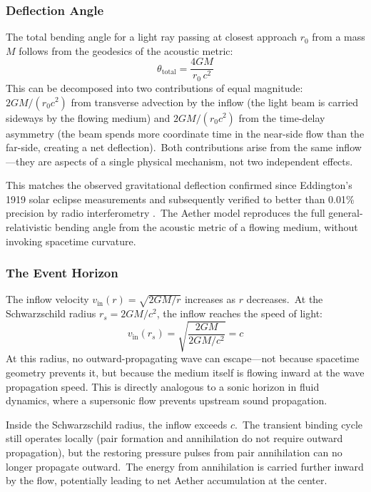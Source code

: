 ﻿\documentclass[12pt,letterpaper]{article}
\newcommand{\vin}{v_{\mathrm{in}}}
\newcommand{\rs}{r_s}
\begin{document}
\subsubsection{Deflection Angle}

The total bending angle for a light ray passing at closest approach $r_0$ from a mass
$M$ follows from the geodesics of the acoustic metric:
%
\begin{equation}
  \theta_{\mathrm{total}} = \frac{4GM}{r_0 \, c^2}
  \label{eq:lensing}
\end{equation}
%
This can be decomposed into two contributions of equal magnitude:
$2GM/(r_0 c^2)$ from transverse advection by the inflow (the light beam is
carried sideways by the flowing medium) and $2GM/(r_0 c^2)$ from the
time-delay asymmetry (the beam spends more coordinate time in the near-side
flow than the far-side, creating a net deflection).\ Both contributions arise
from the same inflow---they are aspects of a single physical mechanism, not
two independent effects.

This matches the observed gravitational deflection confirmed since Eddington's 1919
solar eclipse measurements and subsequently verified to better than 0.01\% precision by
radio interferometry \cite{bertotti2003}.\ The Aether model reproduces the full
general-relativistic bending angle from the acoustic metric of a flowing medium, without
invoking spacetime curvature.

\subsubsection{The Event Horizon}

The inflow velocity $\vin(r) = \sqrt{2GM/r}$ increases as $r$ decreases.\ At the Schwarzschild
radius $\rs = 2GM/c^2$, the inflow reaches the speed of light:
%
\begin{equation}
  \vin(\rs) = \sqrt{\frac{2GM}{2GM/c^2}} = c
\end{equation}
%
At this radius, no outward-propagating wave can escape---not because spacetime geometry
prevents it, but because the medium itself is flowing inward at the wave propagation speed.
This is directly analogous to a sonic horizon in fluid dynamics, where a supersonic flow
prevents upstream sound propagation.

Inside the Schwarzschild radius, the inflow exceeds $c$.\ The transient binding cycle still
operates locally (pair formation and annihilation do not require outward propagation), but
the restoring pressure pulses from pair annihilation can no longer propagate outward.\ The
energy from annihilation is carried further inward by the flow, potentially leading to net
Aether accumulation at the center.
\end{document}
